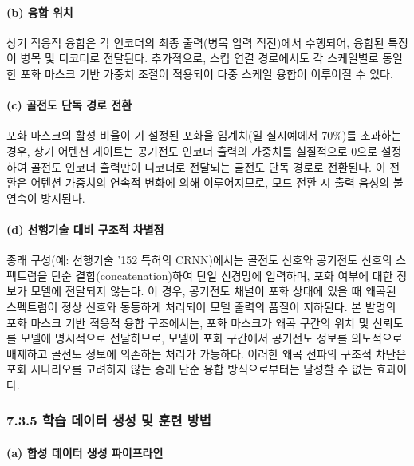 \documentclass{article}
\begin{document}
\paragraph{(b) 융합 위치}

상기 적응적 융합은 각 인코더의 최종 출력(병목 입력 직전)에서 수행되어, 융합된 특징이 병목 및 디코더로 전달된다. 추가적으로, 스킵 연결 경로에서도 각 스케일별로 동일한 포화 마스크 기반 가중치 조절이 적용되어 다중 스케일 융합이 이루어질 수 있다.

\paragraph{(c) 골전도 단독 경로 전환}

포화 마스크의 활성 비율이 기 설정된 포화율 임계치(일 실시예에서 70\%)를 초과하는 경우, 상기 어텐션 게이트는 공기전도 인코더 출력의 가중치를 실질적으로 0으로 설정하여 골전도 인코더 출력만이 디코더로 전달되는 골전도 단독 경로로 전환된다. 이 전환은 어텐션 가중치의 연속적 변화에 의해 이루어지므로, 모드 전환 시 출력 음성의 불연속이 방지된다.

\paragraph{(d) 선행기술 대비 구조적 차별점}

종래 구성(예: 선행기술 '152 특허의 CRNN)에서는 골전도 신호와 공기전도 신호의 스펙트럼을 단순 결합(concatenation)하여 단일 신경망에 입력하며, 포화 여부에 대한 정보가 모델에 전달되지 않는다. 이 경우, 공기전도 채널이 포화 상태에 있을 때 왜곡된 스펙트럼이 정상 신호와 동등하게 처리되어 모델 출력의 품질이 저하된다. 본 발명의 포화 마스크 기반 적응적 융합 구조에서는, 포화 마스크가 왜곡 구간의 위치 및 신뢰도를 모델에 명시적으로 전달하므로, 모델이 포화 구간에서 공기전도 정보를 의도적으로 배제하고 골전도 정보에 의존하는 처리가 가능하다. 이러한 왜곡 전파의 구조적 차단은 포화 시나리오를 고려하지 않는 종래 단순 융합 방식으로부터는 달성할 수 없는 효과이다.

\subsubsection{7.3.5 학습 데이터 생성 및 훈련 방법}

\paragraph{(a) 합성 데이터 생성 파이프라인}
\end{document}
